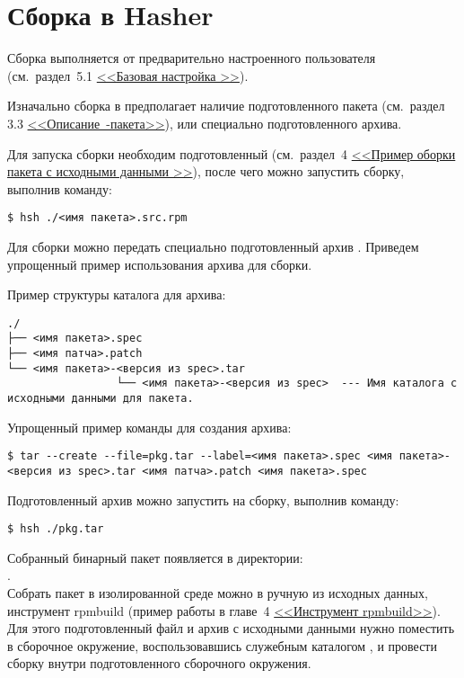 \section{Сборка в Hasher}
Сборка выполняется от предварительно настроенного пользователя
(см.~раздел~5.1 \hyperlink{5.1}{<<Базовая настройка >>}).

Изначально сборка в  предполагает наличие подготовленного  пакета
(см.~раздел 3.3 \hyperlink{rpm-pack-desc}{\mbox{<<Описание -пакета>>}}),
или специально подготовленного  архива.

Для запуска сборки необходим подготовленный  (см.~раздел~4
\hyperlink{rpmbuild-exampl-src}{<<Пример оборки пакета с исходными данными >>}),
после чего можно запустить сборку, выполнив команду:

\begin{verbatim}
$ hsh ./<имя пакета>.src.rpm
\end{verbatim}

Для сборки можно передать специально подготовленный архив . Приведем упрощенный пример
использования архива для сборки.

Пример структуры каталога для архива:
\begin{verbatim}
./
├── <имя пакета>.spec
├── <имя патча>.patch
└── <имя пакета>-<версия из spec>.tar
                 └── <имя пакета>-<версия из spec>  --- Имя каталога с исходными данными для пакета.
\end{verbatim}

Упрощенный пример команды для создания  архива:
\begin{verbatim}
$ tar --create --file=pkg.tar --label=<имя пакета>.spec <имя пакета>-<версия из spec>.tar <имя патча>.patch <имя пакета>.spec
\end{verbatim}

Подготовленный архив можно запустить на сборку, выполнив команду:
\begin{verbatim}
$ hsh ./pkg.tar
\end{verbatim}

Собранный бинарный пакет появляется в директории:\\ .\\

Собрать пакет в изолированной среде можно в ручную из исходных данных, инструмент rpmbuild (пример работы
в главе~4  \hyperlink{rpmbuild}{<<Инструмент rpmbuild>>}). Для этого подготовленный файл  и архив
с исходными данными нужно поместить в сборочное окружение, воспользовавшись служебным каталогом
, и провести сборку  внутри подготовленного сборочного окружения.


